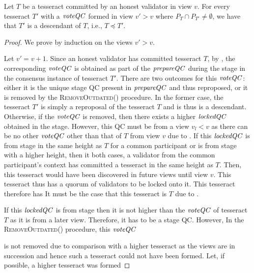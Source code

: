 \begin{lemma}\label{lem:safetyinduction}
Let $T$ be a tesseract committed by an honest validator in view $v$. For every tesseract $T'$ with a $\mathit{voteQC}$ formed in view $v'>v$ where $P_T\cap P_{T'}\neq\emptyset$, we have that $T'$ is a descendant of $T$, i.e., $T\preceq T'$.
\end{lemma}
\begin{proof}
We prove by induction on the views $v'>v$. 

Let $v'=v+1$. Since an honest validator has committed tesseract $T$, by , the corresponding $\mathit{voteQC}$ is obtained as part of the $\mathit{prepareQC}$ during the  stage in the consensus instance of tesseract $T'$. 
There are two outcomes for this $\mathit{voteQC}$: either it is the unique  stage QC present in $\mathit{prepareQC}$ and thus reproposed, or it is removed by the \textsc{RemoveOutdated}() procedure. 
In the former case, the tesseract $T'$ is simply a reproposal of the tesseract $T$ and is thus is a descendant. 
Otherwise, if the $\mathit{voteQC}$ is removed, then there exists a higher $\mathit{lockedQC}$ obtained in the  stage. However, this QC must be from a view $v_l<v$ as there can be no other $\mathit{voteQC}$ other than that of $T$ from view $v$ due to . 
If this $\mathit{lockedQC}$ is from  stage in the same height as $T$ for a common participant or is from  stage with a higher height, then it both cases, a validator from the common participant's context has committed a tesseract in the same height as $T$. 
Then, this tesseract would have been discovered in future views until view $v$. 
This tesseract thus has a quorum of validators to be locked onto it. This tesseract therefore has 
It must be the case that this tesseract is $T$ due to . 


If this $\mathit{lockedQC}$ is from  stage 
then it is not higher than the $\mathit{voteQC}$ of tesseract $T$ as it is from a later view. 
Therefore, it has to be a  stage QC. 
However, 
In the \textsc{RemoveOutdated}() procedure, this $\mathit{voteQC}$ 

is not removed due to comparison with a higher tesseract as the views are in succession and hence such a tesseract could not have been formed. Let, if possible, a higher tesseract was formed 


\end{proof}
